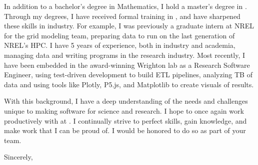 \documentclass[11pt,twoside]{letter}
\begin{document}
\begin{letter}{}
In addition to a bachelor's degree in Mathematics, I hold a master's degree in \degree{}.
Through my degrees, I have received formal training in \class{}, and have sharpened these skills in industry.
For example, I was previously a graduate intern at NREL for the grid modeling team, preparing data to run on the last generation of NREL's HPC.
I have 5 years of experience, both in industry and academia, managing data and writing programs in the research industry.
Most recently, I have been embedded in the award-winning Wrighton lab as a Research Software Engineer,
using test-driven development to build ETL pipelines, analyzing TB of data and using tools like Plotly, P5.js, and  Matplotlib to create visuals of results.  
\extratwo{}

With this background, I have a deep understanding of the needs and challenges unique to making software for science and research.
I hope to
once again
work productively with \colabs{} at \cnameshort{}.
I continually strive to perfect skills, gain knowledge, and make work that I can be proud of.
I would be honored to do so as part of your team.
  \closing{Sincerely,}


\end{letter}
\end{document}
